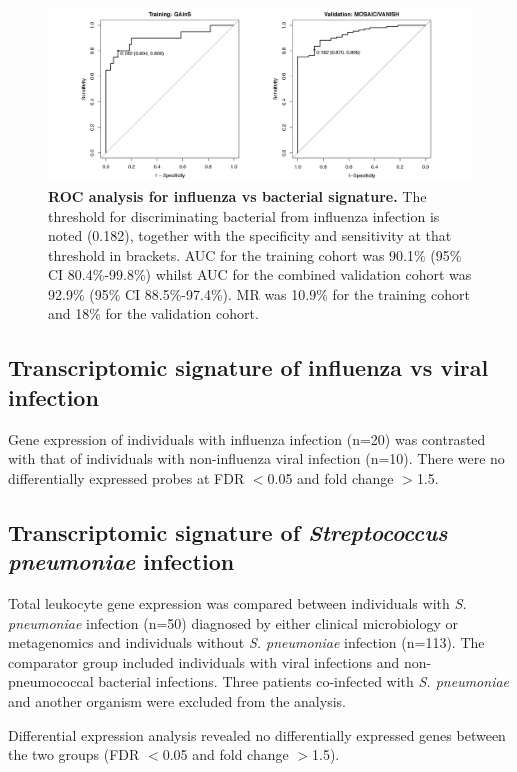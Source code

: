 \FloatBarrier
\begin{figure}[htbp]
\centering
\includegraphics[width=\textwidth]{./Results3/Images/roc-flu-both.png}
\caption[ROC analysis for influenza vs bacterial signature]{\textbf{ROC analysis for influenza vs bacterial signature.} The threshold for discriminating bacterial from influenza infection is noted (0.182), together with the specificity and sensitivity at that threshold in brackets. AUC for the training cohort was 90.1\% (95\% CI 80.4\%-99.8\%) whilst AUC for the combined validation cohort was 92.9\% (95\% CI 88.5\%-97.4\%). MR was 10.9\% for the training cohort and 18\% for the validation cohort.}
\label{fig:roc-flu}
\end{figure}
\FloatBarrier
 
\subsection{Transcriptomic signature of influenza vs viral infection}
Gene expression of individuals with influenza infection (n=20) was contrasted with that of individuals with non-influenza viral infection (n=10). There were no differentially expressed probes at FDR $<$0.05 and fold change $>$1.5.

\subsection{Transcriptomic signature of \textit{Streptococcus pneumoniae} infection}
Total leukocyte gene expression was compared between individuals with \textit{S. pneumoniae} infection (n=50) diagnosed by either clinical microbiology or metagenomics and individuals without \textit{S. pneumoniae} infection (n=113). The comparator group included individuals with viral infections and non-pneumococcal bacterial infections. Three patients co-infected with \textit{S. pneumoniae} and another organism were excluded from the analysis.

Differential expression analysis revealed no differentially expressed genes between the two groups (FDR $<$0.05 and fold change $>$1.5).

